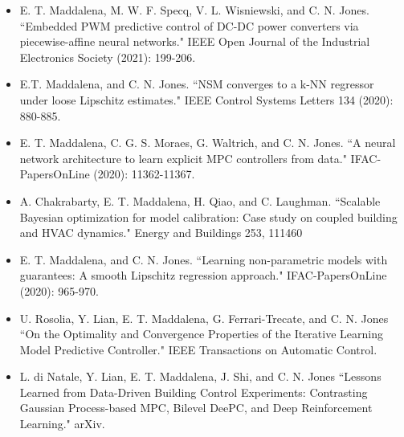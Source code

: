 \begin{itemize}
	\item E. T. Maddalena, M. W. F. Specq, V. L. Wisniewski, and C. N. Jones. ``Embedded PWM predictive control of DC-DC power converters via piecewise-affine neural networks." IEEE Open Journal of the Industrial Electronics Society (2021): 199-206.
	
	\item E.T. Maddalena, and C. N. Jones. ``NSM converges to a k-NN regressor under loose Lipschitz estimates." IEEE Control Systems Letters  134 (2020): 880-885.
	
	\item E. T. Maddalena, C. G. S. Moraes, G. Waltrich, and C. N. Jones. ``A neural network architecture to learn explicit MPC controllers from data." IFAC-PapersOnLine (2020): 11362-11367.
	
	\item A. Chakrabarty, E. T. Maddalena, H. Qiao, and C. Laughman. ``Scalable Bayesian optimization for model calibration: Case study on coupled building and HVAC dynamics." Energy and Buildings 253, 111460
	
	\item E. T. Maddalena, and C. N. Jones. ``Learning non-parametric models with guarantees: A smooth Lipschitz regression approach."  IFAC-PapersOnLine (2020): 965-970.
	
	\item U. Rosolia, Y. Lian, E. T. Maddalena, G. Ferrari-Trecate, and C. N. Jones ``On the Optimality and Convergence Properties of the Iterative Learning Model Predictive Controller." IEEE Transactions on Automatic Control.
	
	\item L. di Natale, Y. Lian, E. T. Maddalena, J. Shi, and C. N. Jones ``Lessons Learned from Data-Driven Building Control Experiments: Contrasting Gaussian Process-based MPC, Bilevel DeePC, and Deep Reinforcement Learning." arXiv.
	
	
	
\end{itemize}